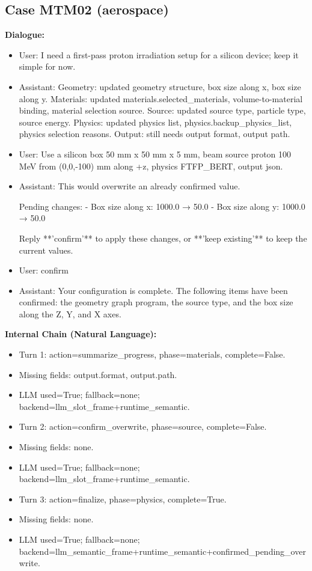 \documentclass[11pt]{ctexart}
\begin{document}
\subsection{Case MTM02 (aerospace)}
\textbf{Dialogue:}
\begin{itemize}
\item User: I need a first-pass proton irradiation setup for a silicon device; keep it simple for now.
\item Assistant: Geometry: updated geometry structure, box size along x, box size along y. Materials: updated materials.selected\_materials, volume-to-material binding, material selection source. Source: updated source type, particle type, source energy. Physics: updated physics list, physics.backup\_physics\_list, physics selection reasons. Output: still needs output format, output path.
\item User: Use a silicon box 50 mm x 50 mm x 5 mm, beam source proton 100 MeV from (0,0,-100) mm along +z, physics FTFP\_BERT, output json.
\item Assistant: This would overwrite an already confirmed value.

Pending changes:
- Box size along x: 1000.0 → 50.0
- Box size along y: 1000.0 → 50.0

Reply **'confirm'** to apply these changes, or **'keep existing'** to keep the current values.
\item User: confirm
\item Assistant: Your configuration is complete. The following items have been confirmed: the geometry graph program, the source type, and the box size along the Z, Y, and X axes.
\end{itemize}
\textbf{Internal Chain (Natural Language):}
\begin{itemize}
\item Turn 1: action=summarize\_progress, phase=materials, complete=False.
\item Missing fields: output.format, output.path.
\item LLM used=True; fallback=none; backend=llm\_slot\_frame+runtime\_semantic.
\item Turn 2: action=confirm\_overwrite, phase=source, complete=False.
\item Missing fields: none.
\item LLM used=True; fallback=none; backend=llm\_slot\_frame+runtime\_semantic.
\item Turn 3: action=finalize, phase=physics, complete=True.
\item Missing fields: none.
\item LLM used=True; fallback=none; backend=llm\_semantic\_frame+runtime\_semantic+confirmed\_pending\_overwrite.
\end{itemize}
\end{document}
